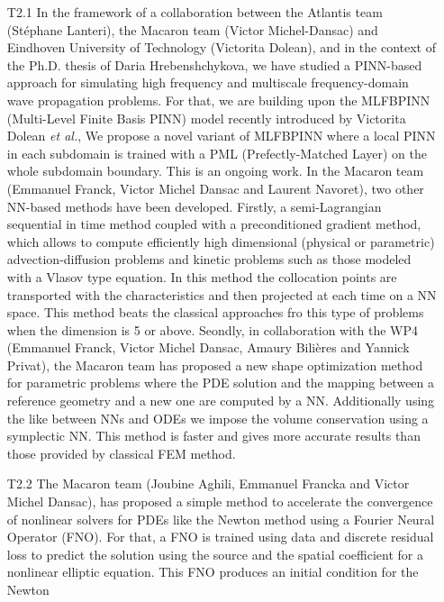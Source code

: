 \begin{itemize}
\item[T2.1] In the  framework of a collaboration  between the Atlantis
  team (St\'ephane  Lanteri), the Macaron team  (Victor Michel-Dansac)
  and Eindhoven  University of  Technology (Victorita Dolean),  and in
  the context of  the Ph.D.  thesis of Daria  Hrebenshchykova, we have
  studied  a PINN-based  approach  for simulating  high frequency  and
  multiscale frequency-domain wave propagation  problems. For that, we
  are building upon the MLFBPINN (Multi-Level Finite Basis PINN) model
  recently introduced by  Victorita Dolean {\em et al.},  We propose a
  novel variant  of MLFBPINN where a  local PINN in each  subdomain is
  trained with a PML (Prefectly-Matched  Layer) on the whole subdomain
  boundary.  This  is an ongoing  work. In the Macaron  team (Emmanuel
  Franck,  Victor  Michel  Dansac  and  Laurent  Navoret),  two  other
  NN-based methods  have been  developed.  Firstly,  a semi-Lagrangian
  sequential  in time  method coupled  with a  preconditioned gradient
  method,  which  allows  to   compute  efficiently  high  dimensional
  (physical  or parametric)  advection-diffusion problems  and kinetic
  problems such as those modeled with a Vlasov type equation.  In this
  method   the   collocation   points   are   transported   with   the
  characteristics and then projected at each time on a NN space.  This
  method beats the classical approaches fro this type of problems when
  the dimension is 5 or above.  Seondly, in collaboration with the WP4
  (Emmanuel Franck, Victor Michel  Dansac, Amaury Bilières and Yannick
  Privat),  the Macaron  team has  proposed a  new shape  optimization
  method  for  parametric problems  where  the  PDE solution  and  the
  mapping between a reference geometry and a new one are computed by a
  NN.  Additionally using the like between  NNs and ODEs we impose the
  volume conservation  using a symplectic  NN.  This method  is faster
  and gives more accurate results than those provided by classical FEM
  method.
\item[T2.2]  The Macaron  team (Joubine  Aghili, Emmanuel  Francka and
  Victor Michel  Dansac), has proposed  a simple method  to accelerate
  the convergence of nonlinear solvers for PDEs like the Newton method
  using a Fourier  Neural Operator (FNO).  For that, a  FNO is trained
  using data and discrete residual  loss to predict the solution using
  the  source and  the spatial  coefficient for  a nonlinear  elliptic
  equation.  This  FNO produces  an initial  condition for  the Newton

\end{itemize}
